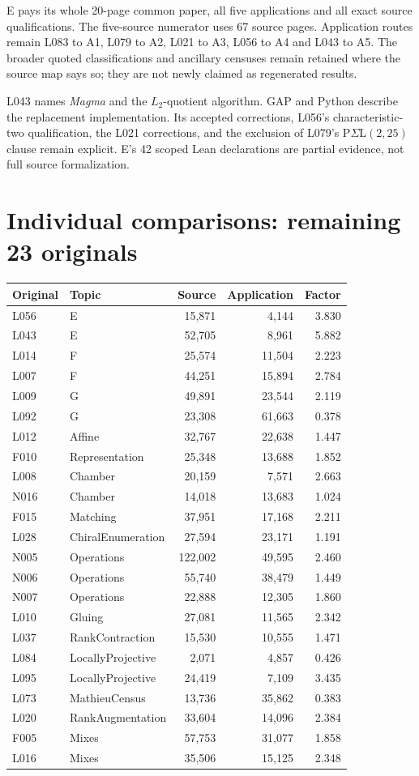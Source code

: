 \documentclass[11pt,a4paper]{article}
\begin{document}
E pays its whole 20-page common paper, all five applications and all exact source qualifications. The five-source numerator uses 67 source pages. Application routes remain L083 to A1, L079 to A2, L021 to A3, L056 to A4 and L043 to A5. The broader quoted classifications and ancillary censuses remain retained where the source map says so; they are not newly claimed as regenerated results.

L043 names \emph{Magma} and the $L_2$-quotient algorithm. GAP and Python describe the replacement implementation. Its accepted corrections, L056's characteristic-two qualification, the L021 corrections, and the exclusion of L079's P$\Sigma$L$(2,25)$ clause remain explicit. E's 42 scoped Lean declarations are partial evidence, not full source formalization.
\newpage
\section*{Individual comparisons: remaining 23 originals}
\begin{center}\small\begin{tabular}{llrrr}\toprule
Original & Topic & Source & Application & Factor\\\midrule
L056 & E & 15,871 & 4,144 & 3.830 \\
L043 & E & 52,705 & 8,961 & 5.882 \\
L014 & F & 25,574 & 11,504 & 2.223 \\
L007 & F & 44,251 & 15,894 & 2.784 \\
L009 & G & 49,891 & 23,544 & 2.119 \\
L092 & G & 23,308 & 61,663 & 0.378 \\
L012 & Affine & 32,767 & 22,638 & 1.447 \\
F010 & Representation & 25,348 & 13,688 & 1.852 \\
L008 & Chamber & 20,159 & 7,571 & 2.663 \\
N016 & Chamber & 14,018 & 13,683 & 1.024 \\
F015 & Matching & 37,951 & 17,168 & 2.211 \\
L028 & ChiralEnumeration & 27,594 & 23,171 & 1.191 \\
N005 & Operations & 122,002 & 49,595 & 2.460 \\
N006 & Operations & 55,740 & 38,479 & 1.449 \\
N007 & Operations & 22,888 & 12,305 & 1.860 \\
L010 & Gluing & 27,081 & 11,565 & 2.342 \\
L037 & RankContraction & 15,530 & 10,555 & 1.471 \\
L084 & LocallyProjective & 2,071 & 4,857 & 0.426 \\
L095 & LocallyProjective & 24,419 & 7,109 & 3.435 \\
L073 & MathieuCensus & 13,736 & 35,862 & 0.383 \\
L020 & RankAugmentation & 33,604 & 14,096 & 2.384 \\
F005 & Mixes & 57,753 & 31,077 & 1.858 \\
L016 & Mixes & 35,506 & 15,125 & 2.348 \\\bottomrule\end{tabular}\end{center}
\end{document}
